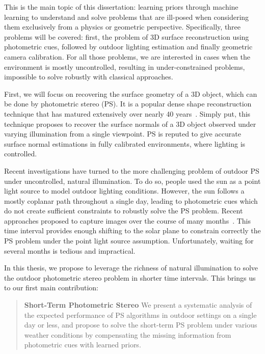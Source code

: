 This is the main topic of this dissertation: learning priors through machine learning to understand and solve problems that are ill-posed when considering them exclusively from a physics or geometric perspective. Specifically, three problems will be covered: first, the problem of 3D surface reconstruction using photometric cues, followed by outdoor lighting estimation and finally geometric camera calibration. For all those problems, we are interested in cases when the environment is mostly uncontrolled, resulting in under-constrained problems, impossible to solve robustly with classical approaches. 

First, we will focus on recovering the surface geometry of a 3D object, which can be done by photometric stereo (PS). It is a popular dense shape reconstruction technique that has matured extensively over nearly 40 years~\cite{woodham-opteng-80}. %
Simply put, this technique proposes to recover the surface normals of a 3D object observed under varying illumination from a single viewpoint. 
PS is reputed to give accurate surface normal estimations in fully calibrated environments, where lighting is controlled. 

Recent investigations have turned to the more challenging problem of outdoor PS under uncontrolled, natural illumination. To do so, people used the sun as a point light source to model outdoor lighting conditions. However, the sun follows a mostly coplanar path throughout a single day, leading to photometric cues which do not create sufficient constraints to robustly solve the PS problem. Recent approaches proposed to capture images over the course of many months~\cite{ackermann-cvpr-12,abrams-eccv-12}. This time interval provides enough shifting to the solar plane to constrain correctly the PS problem under the point light source assumption. Unfortunately, waiting for several months is tedious and impractical. 

In this thesis, we propose to leverage the richness of natural illumination to solve the outdoor photometric stereo problem in shorter time intervals. This brings us to our first main contribution: 

\begin{quotation}
\textbf{Short-Term Photometric Stereo} We present a systematic analysis of the expected performance of PS algorithms in outdoor settings on a single day or less, and propose to solve the short-term PS problem under various weather conditions by compensating the missing information from photometric cues with learned priors. 
\end{quotation}

